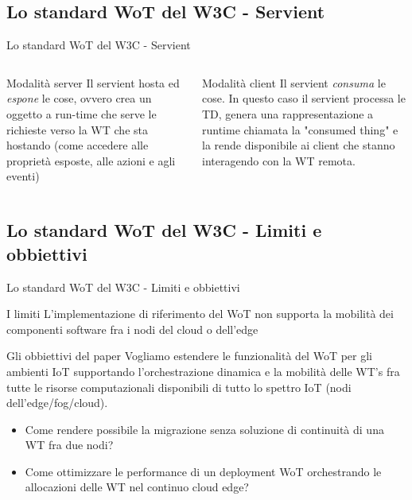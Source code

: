 \documentclass{beamer}
\begin{document}
\subsection{Lo standard WoT del W3C - Servient}
\begin{frame}{Lo standard WoT del W3C - Servient}
	\begin{columns}[T]
		\begin{column}{0.45\textwidth}
			\begin{block}{Modalità server}
				Il servient hosta ed \textit{espone} le cose, ovvero crea un oggetto a run-time che serve le richieste verso la WT che sta hostando (come accedere alle proprietà esposte, alle azioni e agli eventi)
			\end{block}
		\end{column}
		\begin{column}{0.45\textwidth}
			\begin{block}{Modalità client}
				Il servient \textit{consuma} le cose. In questo caso il servient  processa le TD, genera una rappresentazione a runtime chiamata la "consumed thing" e la rende disponibile ai client che stanno interagendo con la WT remota.
			\end{block}
		\end{column}
	\end{columns}
\end{frame}



\subsection{Lo standard WoT del W3C - Limiti e obbiettivi}
	\begin{frame}{Lo standard WoT del W3C - Limiti e obbiettivi}
		\begin{alertblock}{I limiti}
			L’implementazione di riferimento del WoT
			non supporta la mobilità dei componenti software fra i nodi del cloud o dell’edge
		\end{alertblock}
		\begin{exampleblock}{Gli obbiettivi del paper}
			Vogliamo estendere le funzionalità del WoT per gli ambienti
			IoT supportando l’orchestrazione dinamica e la mobilità delle WT’s fra tutte le risorse computazionali
			disponibili di tutto lo spettro IoT (nodi dell’edge/fog/cloud).
			\begin{itemize}
				\item Come rendere possibile la migrazione senza soluzione di continuità di una WT fra due nodi?
				\item Come ottimizzare le performance di un deployment WoT orchestrando le allocazioni delle WT nel continuo cloud edge?
			\end{itemize}
		\end{exampleblock}
	\end{frame}
\end{document}
